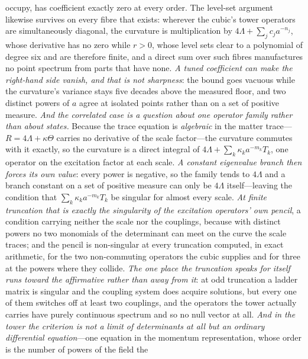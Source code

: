 \documentclass[11pt,a4paper]{article}
\theoremstyle{plain}
\theoremstyle{definition}
\theoremstyle{remark}
\begin{document}
occupy, has coefficient exactly zero at every
order.
The level-set argument likewise
survives on every fibre that exists: wherever the cubic's tower operators are simultaneously diagonal, the
curvature is multiplication by $4\Lambda+\sum_j c_j a^{-n_j}$, whose derivative has no zero while $r>0$,
whose level sets clear to a polynomial of degree six and are therefore finite, and a direct sum over such
fibres manufactures no point spectrum from parts that have
none.
\emph{A tuned coefficient can make the right-hand side vanish, and that is not sharpness}: the bound goes
vacuous while the curvature's variance stays five decades above the measured floor, and two distinct
powers of $a$ agree at isolated points rather than on a set of positive measure. \emph{And the correlated
case is a question about one operator family rather than about states.} Because the trace equation is
\emph{algebraic} in the matter trace---$R=4\Lambda+\kappa\Theta$ carries no derivative of the scale
factor---the curvature commutes with it exactly, so the curvature is a direct integral of
$4\Lambda+\sum_k\kappa_k a^{-m_k}T_k$, one operator on the excitation factor at each scale. \emph{A constant
eigenvalue branch then forces its own value}: every power is negative, so the family tends to $4\Lambda$ and
a branch constant on a set of positive measure can only be $4\Lambda$ itself---leaving the condition that
$\sum_k\kappa_k a^{-m_k}T_k$ be singular for almost every scale. \emph{At finite truncation that is exactly
the singularity of the excitation operators' own pencil}, a condition carrying neither the scale nor the
couplings, because with distinct powers no two monomials of the determinant can meet on the curve the scale
traces; and the pencil is non-singular at every truncation computed, in exact arithmetic, for the two
non-commuting operators the cubic supplies and for three at the powers where they
collide.
\emph{The one place the truncation speaks for itself runs toward the affirmative rather than away from it}: at
odd truncation a ladder matrix is singular and the coupling system does acquire solutions, but every one of
them switches off at least two couplings, and the operators the tower actually carries have purely continuous
spectrum and so no null vector at all. \emph{And in the tower the criterion is not a limit of determinants at all but an ordinary differential
equation}---one equation in the momentum representation, whose order is the number of powers of the field the
\end{document}
